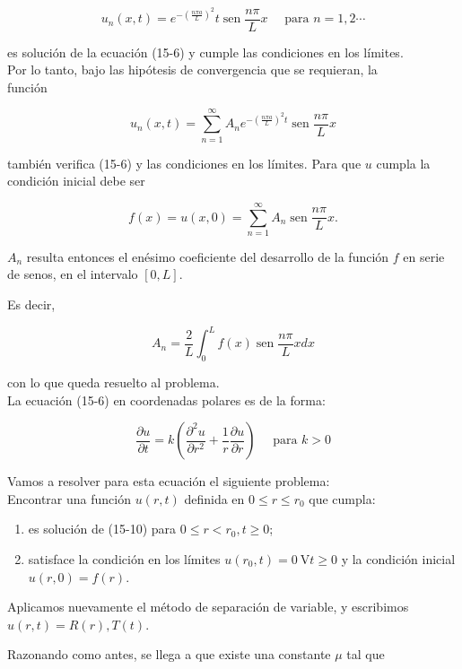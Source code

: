 \documentclass[10pt]{article}
\theoremstyle{plain}
\theoremstyle{definition}
\theoremstyle{remark}
\begin{document}
$$
u_{n}(x, t)=e^{-\left(\frac{n \pi a}{L}\right)^{2}} t \operatorname{sen} \frac{n \pi}{L} x \quad \text { para } n=1,2 \cdots
$$

es solución de la ecuación (15-6) y cumple las condiciones en los límites.\\
Por lo tanto, bajo las hipótesis de convergencia que se requieran, la\\
función

$$
u_{n}(x, t)=\sum_{n=1}^{\infty} A_{n} e^{-\left(\frac{n \pi a}{L}\right)^{2} t} \operatorname{sen} \frac{n \pi}{L} x
$$

también verifica (15-6) y las condiciones en los límites. Para que $u$ cumpla la condición inicial debe ser

$$
f(x)=u(x, 0)=\sum_{n=1}^{\infty} A_{n} \operatorname{sen} \frac{n \pi}{L} x .
$$

$A_{n}$ resulta entonces el enésimo coeficiente del desarrollo de la función $f$ en serie de senos, en el intervalo $[0, L]$.

Es decir,

$$
A_{n}=\frac{2}{L} \int_{0}^{L} f(x) \operatorname{sen} \frac{n \pi}{L} x d x
$$

con lo que queda resuelto al problema.\\
La ecuación (15-6) en coordenadas polares es de la forma:


\begin{equation*}
\frac{\partial u}{\partial t}=k\left(\frac{\partial^{2} u}{\partial r^{2}}+\frac{1}{r} \frac{\partial u}{\partial r}\right) \quad \text { para } k>0 \tag{15-10}
\end{equation*}


Vamos a resolver para esta ecuación el siguiente problema:\\
Encontrar una función $u(r, t)$ definida en $0 \leqslant r \leqslant r_{0}$ que cumpla:

\begin{enumerate}
  \item es solución de (15-10) para $0 \leqslant r<r_{0}, t \geqslant 0$;
  \item satisface la condición en los límites $u\left(r_{0}, t\right)=0 \mathrm{~V} t \geqslant 0$ y la condición inicial $u(r, 0)=f(r)$.
\end{enumerate}

Aplicamos nuevamente el método de separación de variable, y escribimos $u(r, t)=R(r), T(t)$.

Razonando como antes, se llega a que existe una constante $\mu$ tal que
\end{document}
